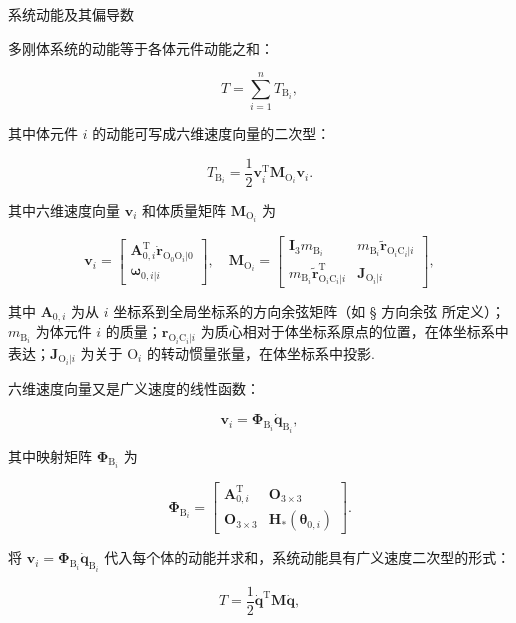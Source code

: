 \begin{conclusion}[结论 9.6]
{系统动能及其偏导数}

多刚体系统的动能等于各体元件动能之和：

\[
T = \sum_{i=1}^{n} T_{\text{B}_i},
\]

其中体元件 $i$ 的动能可写成六维速度向量的二次型：

\[
T_{\text{B}_i} = \frac{1}{2} \boldsymbol{v}_i^\text{T} \boldsymbol{M}_{\text{O}_i} \boldsymbol{v}_i.
\]

其中六维速度向量 $\boldsymbol{v}_i$ 和体质量矩阵 $\boldsymbol{M}_{\text{O}_i}$ 为

\[
\boldsymbol{v}_i = \begin{bmatrix} \boldsymbol{A}_{0,i}^\text{T} \dot{\boldsymbol{r}}_{\text{O}_0\text{O}_i|0} \\ \boldsymbol{\omega}_{0,i|i} \end{bmatrix}, \quad
\boldsymbol{M}_{\text{O}_i} = \begin{bmatrix} \boldsymbol{I}_3 m_{\text{B}_i} & m_{\text{B}_i} \tilde{\boldsymbol{r}}_{\text{O}_i\text{C}_i|i} \\ m_{\text{B}_i} \tilde{\boldsymbol{r}}_{\text{O}_i\text{C}_i|i}^\text{T} & \boldsymbol{J}_{\text{O}_i|i} \end{bmatrix},
\]

其中 $\boldsymbol{A}_{0,i}$ 为从 $i$ 坐标系到全局坐标系的方向余弦矩阵（如 § 方向余弦 所定义）；$m_{\text{B}_i}$ 为体元件 $i$ 的质量；$\boldsymbol{r}_{\text{O}_i\text{C}_i|i}$ 为质心相对于体坐标系原点的位置，在体坐标系中表达；$\boldsymbol{J}_{\text{O}_i|i}$ 为关于 $\text{O}_i$ 的转动惯量张量，在体坐标系中投影.

六维速度向量又是广义速度的线性函数：

\[
\boldsymbol{v}_i = \boldsymbol{\Phi}_{\text{B}_i} \dot{\boldsymbol{q}}_{\text{B}_i},
\]

其中映射矩阵 $\boldsymbol{\Phi}_{\text{B}_i}$ 为

\[
\boldsymbol{\Phi}_{\text{B}_i} = \begin{bmatrix} \boldsymbol{A}_{0,i}^\text{T} & \boldsymbol{O}_{3\times 3} \\ \boldsymbol{O}_{3\times 3} & \boldsymbol{H}_*(\boldsymbol{\theta}_{0,i}) \end{bmatrix}.
\]

将 $\boldsymbol{v}_i = \boldsymbol{\Phi}_{\text{B}_i} \dot{\boldsymbol{q}}_{\text{B}_i}$ 代入每个体的动能并求和，系统动能具有广义速度二次型的形式：

\[
T = \frac{1}{2} \dot{\boldsymbol{q}}^\text{T} \boldsymbol{M} \dot{\boldsymbol{q}},
\]


\end{conclusion}
